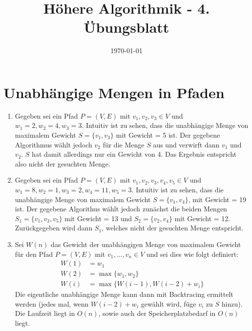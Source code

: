 \documentclass[a4paper,10pt]{article}
\title{H\"ohere Algorithmik - 4. \"Ubungsblatt}
\author{\Authors}
\date{\today}
\begin{document}
\maketitle

\section{Unabhängige Mengen in Pfaden}
\begin{enumerate}
\item   Gegeben sei ein Pfad $P = (V,E)$ mit $v_1,v_2,v_3 \in V$ und $w_1 = 2, w_2 = 4, w_3 = 3$. 
        Intuitiv ist zu sehen, dass die unabhängige Menge von maximalem Gewicht $S = \{v_1, v_3\}$ mit Gewicht = 5 ist. 
        Der gegebene Algorithmus wählt jedoch $v_2$ für die Menge $S$ aus und verwirft dann $v_1$ und $v_2$.
        $S$ hat damit allerdings nur ein Gewicht von 4.
        Das Ergebnis entspricht also nicht der gesuchten Menge.
\item   Gegeben sei ein Pfad $P = (V,E)$ mit $v_1,v_2,v_3,v_4,v_5 \in V$ und $w_1 = 8, w_2 = 1, w_3 = 2, w_4 = 11, w_5 = 3$. 
        Intuitiv ist zu sehen, dass die unabhängige Menge von maximalem Gewicht $S = \{v_1, v_4\}$, mit Gewicht = 19 ist. 
        Der gegebene Algorithus wählt jedoch zunächst die beiden Mengen $S_1 = \{v_1, v_3, v_5\}$ mit Gewicht = 13 und $S_2 = \{v_2, v_4\}$ mit Gewicht = 12. 
        Zurückgegeben wird dann $S_1$, welches nicht der gesuchten Menge entspricht.
\item   Sei $W(n)$ das Gewicht der unabhängigen Menge von maximalem Gewicht für den Pfad $P = (V,E)$ mit $v_1, ..., v_n \in V$ 
        und sei dies wie folgt definiert:
        \begin{align*}
            W(1) &= w_1 \\
            W(2) &= \max\{w_1,w_2\} \\
            W(i) &= \max\{W(i-1), W(i-2)+w_i\} 
        \end{align*}
        Die eigentliche unabhängige Menge kann dann mit Backtracing ermittelt werden (jedes mal, wenn $W(i-2)+w_i$ gewählt wird, füge $v_i$ zu $S$ hinzu).
        Die Laufzeit liegt in $O(n)$, sowie auch der Speicherplatzbedarf in $O(n)$ liegt.
\end{enumerate}
\end{document}
